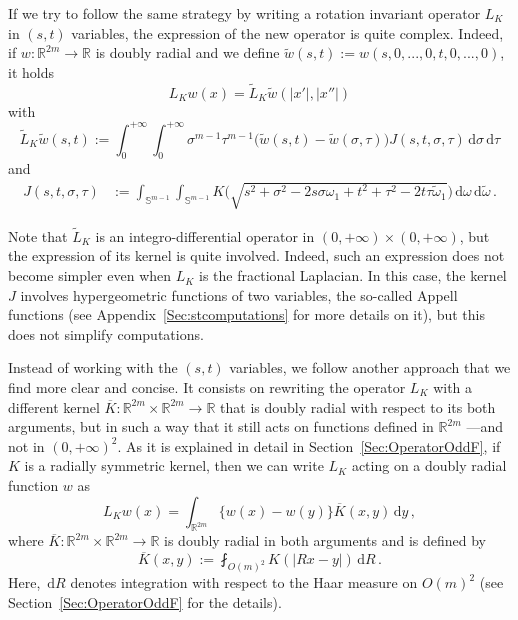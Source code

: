 \documentclass[12pt,reqno]{amsart}
\theoremstyle{definition}
\theoremstyle{remark}
\newcommand{\con}[1]{\mathbb{#1}}
\newcommand{\R}{\con{R}} %
\newcommand{\Sph}{\con{S}} %
\renewcommand{\d}{\,\mathrm{d}} %
\newcommand{\average}{\fint}
\numberwithin{equation}{section}
\begin{document}
If we try to follow the same strategy by writing a rotation invariant operator $L_K$ in $(s,t)$ variables, the expression of the new operator is quite complex. Indeed, if $w:\R^{2m} \to \R$ is doubly radial and we define $\widetilde{w}(s,t) := w(s,0,...,0,t,0,...,0)$, it holds
$$ L_Kw(x) = \widetilde{L}_K \widetilde{w} (|x'|,|x''|)$$
with
\begin{equation}
\label{Eq:L_K-st}
\widetilde{L}_K \widetilde{w} (s,t) := \int_0^{+\infty}  \int_0^{+\infty} \sigma^{m-1} \tau^{m-1} \big(\widetilde{w}(s,t) - \widetilde{w}(\sigma, \tau)\big) J(s,t,\sigma, \tau)  \d \sigma\d \tau
\end{equation}
and
\begin{align*}
J(s,t,\sigma, \tau) &:= \int_{\Sph^{m-1}}  \int_{\Sph^{m-1}} K\Big( \sqrt{s^2+\sigma^2- 2 s \sigma \omega_1 + t^2 + \tau^2 - 2t \tau\tilde\omega_1}\Big) \d \omega \d \tilde\omega\,.
\end{align*}

Note that $\widetilde{L}_K$ is an integro-differential operator in $(0,+\infty)\times(0,+\infty)$, but the expression of its kernel is quite involved. Indeed, such an expression does not become simpler even when $L_K$ is the fractional Laplacian. In this case, the kernel $J$ involves hypergeometric functions of two variables, the so-called Appell functions (see Appendix~\ref{Sec:stcomputations} for more details on it), but this does not simplify computations. 



Instead of working with the $(s,t)$ variables, we follow another approach that we find more clear and concise. It consists on rewriting the operator $L_K$ with a different kernel $\overline{K} : \R^{2m}\times \R^{2m} \to \R$ that is doubly radial with respect to its both arguments, but in such a way that it still acts on functions defined in $\R^{2m}$ ---and not in $(0,+\infty)^2$. As it is explained in detail in Section~\ref{Sec:OperatorOddF}, if $K$ is a radially symmetric kernel, then we can write $L_K$ acting on a doubly radial function $w$ as
\begin{equation}
\label{Eq:L_KWithKbar}
L_K w(x) = \int_{\R^{2m}} \{w(x) - w(y)\} \overline{K}(x,y) \d y\,,
\end{equation}
where $\overline{K} : \R^{2m}\times \R^{2m} \to \R$ is doubly radial in both arguments and is defined by
\begin{equation}
\label{Eq:KbarDef'}
\overline{K}(x,y) := \average_{O(m)^2} K(|Rx - y|)\d R\,.
\end{equation}
Here, $\d R$ denotes integration with respect to the Haar measure on $O(m)^2$ (see Section~\ref{Sec:OperatorOddF} for the details).
\end{document}
